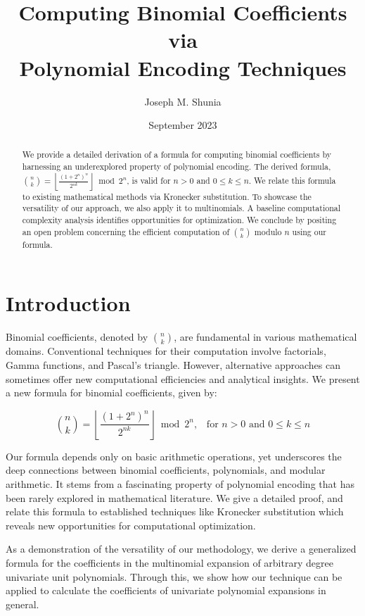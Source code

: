 \documentclass{article}
\title{Computing Binomial Coefficients via\\Polynomial Encoding Techniques}
\author{Joseph M. Shunia}
\date{September 2023}
\theoremstyle{plain}
\theoremstyle{definition}
\begin{document}
\maketitle
\linespread{1.3}
\begin{abstract}
We provide a detailed derivation of a formula for computing binomial coefficients by harnessing an underexplored property of polynomial encoding. The derived formula, $\binom{n}{k} = \left\lfloor\frac{(1 + 2^{n})^{n}}{2^{n k}}\right\rfloor \bmod{2^{n}}$, is valid for $n > 0$ and $0 \leq k \leq n$. We relate this formula to existing mathematical methods via Kronecker substitution. To showcase the versatility of our approach, we also apply it to multinomials. A baseline computational complexity analysis identifies opportunities for optimization. We conclude by positing an open problem concerning the efficient computation of $\binom{n}{k}$ modulo $n$ using our formula.
\end{abstract}
\linespread{1.0}

\section{Introduction}
Binomial coefficients, denoted by \(\binom{n}{k}\), are fundamental in various mathematical domains. Conventional techniques for their computation involve factorials, Gamma functions, and Pascal's triangle. However, alternative approaches can sometimes offer new computational efficiencies and analytical insights. We present a new formula for binomial coefficients, given by:

\begin{equation}
\binom{n}{k} = \left\lfloor\frac{(1 + 2^{n})^{n}}{2^{n k}}\right\rfloor \bmod{2^{n}} \text{,} \quad \text{for } n > 0 \text{ and } 0 \leq k \leq n
\end{equation}

Our formula depends only on basic arithmetic operations, yet underscores the deep connections between binomial coefficients, polynomials, and modular arithmetic. It stems from a fascinating property of polynomial encoding that has been rarely explored in mathematical literature. We give a detailed proof, and relate this formula to established techniques like Kronecker substitution which reveals new opportunities for computational optimization.

As a demonstration of the versatility of our methodology, we derive a generalized formula for the coefficients in the multinomial expansion of arbitrary degree univariate unit polynomials. Through this, we show how our technique can be applied to calculate the coefficients of univariate polynomial expansions in general.
\end{document}
